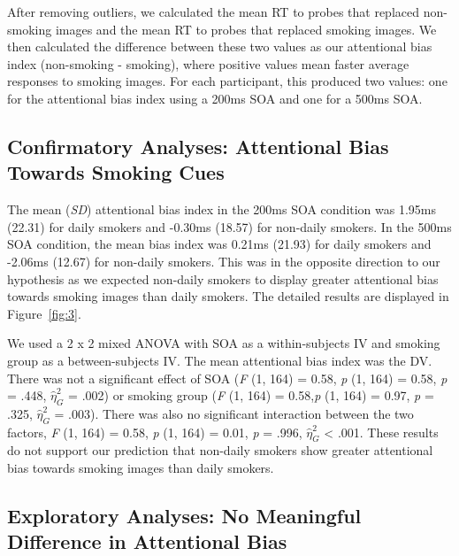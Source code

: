 \documentclass[empirical, authordate]{jote-new-article}
\begin{document}
After removing outliers, we calculated the mean RT to probes that replaced non-smoking images and the mean RT to probes that replaced smoking images. We then calculated the difference between these two values as our attentional bias index (non-smoking - smoking), where positive values mean faster average responses to smoking images. For each participant, this produced two values: one for the attentional bias index using a 200ms SOA and one for a 500ms SOA.
\subsection{Confirmatory Analyses: Attentional Bias Towards Smoking Cues}

The mean (\emph{SD}) attentional bias index in the 200ms SOA condition was 1.95ms (22.31) for daily smokers and -0.30ms (18.57) for non-daily smokers. In the 500ms SOA condition, the mean bias index was 0.21ms (21.93) for daily smokers and -2.06ms (12.67) for non-daily smokers. This was in the opposite direction to our hypothesis as we expected non-daily smokers to display greater attentional bias towards smoking images than daily smokers. The detailed results are displayed in Figure~\ref{fig:3}.

We used a 2 x 2 mixed ANOVA with SOA as a within-subjects IV and smoking group as a between-subjects IV. The mean attentional bias index was the DV. There was not a significant effect of SOA (\emph{F} (1, 164) = 0.58, \emph{p} (1, 164) = 0.58, \emph{p} = .448, $\hat{\eta}_{G}^{2}$ = .002) or smoking group (\emph{F} (1, 164) = 0.58,\emph{p} (1, 164) = 0.97, \emph{p} = .325, $\hat{\eta}_{G}^{2}$ = .003). There was also no significant interaction between the two factors, \emph{F} (1, 164) = 0.58, \emph{p} (1, 164) = 0.01, \emph{p} = .996, $\hat{\eta}_{G}^{2}$ < .001. These results do not support our prediction that non-daily smokers show greater attentional bias towards smoking images than daily smokers.


























\subsection{Exploratory Analyses: No Meaningful Difference in Attentional Bias}
\end{document}
